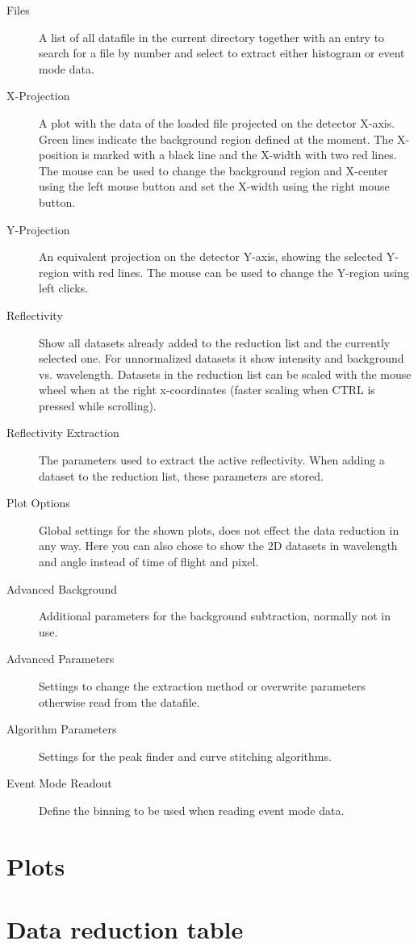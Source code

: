   \begin{description}
   \item[Files] A list of all datafile in the current directory together with an entry to search for a file by number and select to extract either histogram or event mode data.
   \item[X-Projection] A plot with the data of the loaded file projected on the detector X-axis. Green lines indicate the background region defined at the moment. The X-position is marked with a black line and the X-width with two red lines. The mouse can be used to change the background region and X-center using the left mouse button and set the X-width using the right mouse button.
   \item[Y-Projection] An equivalent projection on the detector Y-axis, showing the selected Y-region with red lines. The mouse can be used to change the Y-region using left clicks.
   \item[Reflectivity] Show all datasets already added to the reduction list and the currently selected one. For unnormalized datasets it show intensity and background vs. wavelength. Datasets in the reduction list can be scaled with the mouse wheel when at the right x-coordinates (faster scaling when CTRL is pressed while scrolling).
   \item[Reflectivity Extraction] The parameters used to extract the active reflectivity. When adding a dataset to the reduction list, these parameters are stored.
   \item[Plot Options] Global settings for the shown plots, does not effect the data reduction in any way. Here you can also chose to show the 2D datasets in wavelength and angle instead of time of flight and pixel.
   \item[Advanced Background] Additional parameters for the background subtraction, normally not in use.
   \item[Advanced Parameters] Settings to change the extraction method or overwrite parameters otherwise read from the datafile.
   \item[Algorithm Parameters] Settings for the peak finder and curve stitching algorithms.
   \item[Event Mode Readout] Define the binning to be used when reading event mode data.
  \end{description}


\section{Plots}

\section{Data reduction table}

